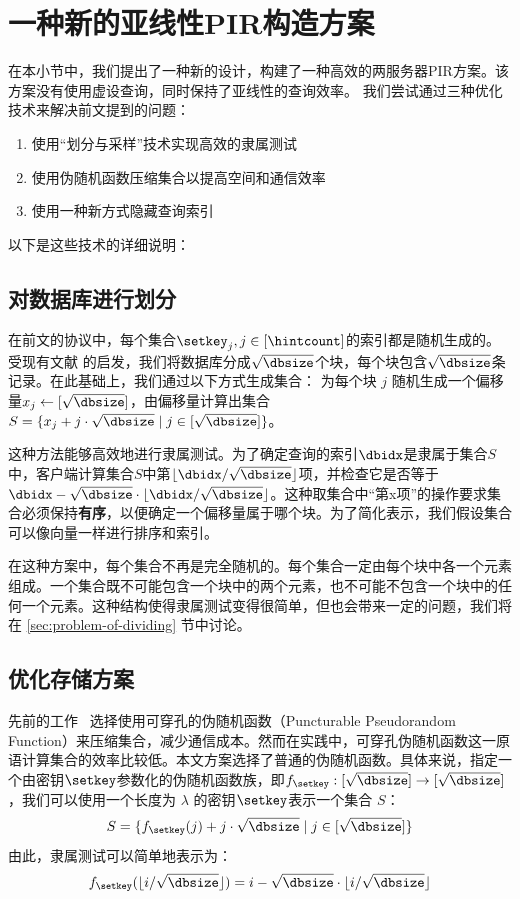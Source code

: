 \section{一种新的亚线性PIR构造方案}
\label{sec:construction}
在本小节中，我们提出了一种新的设计，构建了一种高效的两服务器PIR方案。该方案没有使用虚设查询，同时保持了亚线性的查询效率。
我们尝试通过三种优化技术来解决前文提到的问题：
\begin{enumerate}
    \item 使用“划分与采样”技术实现高效的隶属测试
    \item 使用伪随机函数压缩集合以提高空间和通信效率
    \item 使用一种新方式隐藏查询索引
\end{enumerate}
以下是这些技术的详细说明：
\subsection{对数据库进行划分}

在前文的协议中，每个集合$\setkey_j, j\in[\hintcount]$的索引都是随机生成的。受现有文献 \cite{Piano, C:LazPap23} 的启发，我们将数据库分成$\sqrt{\dbsize}$个块，每个块包含$\sqrt{\dbsize}$条记录。在此基础上，我们通过以下方式生成集合：
为每个块 $j$ 随机生成一个偏移量$x_j \leftarrow [\sqrt{\dbsize}]$，由偏移量计算出集合 $S=\{x_j+j\cdot \sqrt{\dbsize} \mid j \in [\sqrt{\dbsize}]\}$。

这种方法能够高效地进行隶属测试。为了确定查询的索引$\dbidx$是隶属于集合$S$中，客户端计算集合$S$中第$\lfloor \dbidx/\sqrt{\dbsize}\rfloor$项，并检查它是否等于$\dbidx-\sqrt{\dbsize}\cdot\lfloor \dbidx/\sqrt{\dbsize}\rfloor$。这种取集合中“第x项”的操作要求集合必须保持\textbf{有序}，以便确定一个偏移量属于哪个块。为了简化表示，我们假设集合可以像向量一样进行排序和索引。

在这种方案中，每个集合不再是完全随机的。每个集合一定由每个块中各一个元素组成。一个集合既不可能包含一个块中的两个元素，也不可能不包含一个块中的任何一个元素。这种结构使得隶属测试变得很简单，但也会带来一定的问题，我们将在 \ref{sec:problem-of-dividing} 节中讨论。


\subsection{优化存储方案}
先前的工作~\cite{EC:CorKog20, C:LazPap23} 选择使用可穿孔的伪随机函数（Puncturable Pseudorandom Function）来压缩集合，减少通信成本。然而在实践中，可穿孔伪随机函数这一原语计算集合的效率比较低。本文方案选择了普通的伪随机函数。具体来说，指定一个由密钥$\setkey$参数化的伪随机函数族，即$f_{\setkey}: [\sqrt{\dbsize}] \to [\sqrt{\dbsize}]$，我们可以使用一个长度为 $\lambda$ 的密钥$\setkey$表示一个集合 $S$：
$$S = \{f_{\setkey}(j) + j \cdot \sqrt{\dbsize} \mid j \in [\sqrt{\dbsize}]\}$$
由此，隶属测试可以简单地表示为：
$$f_{\setkey}(\lfloor i/\sqrt{\dbsize}\rfloor) = i - \sqrt{\dbsize}\cdot\lfloor i/\sqrt{\dbsize}\rfloor$$

